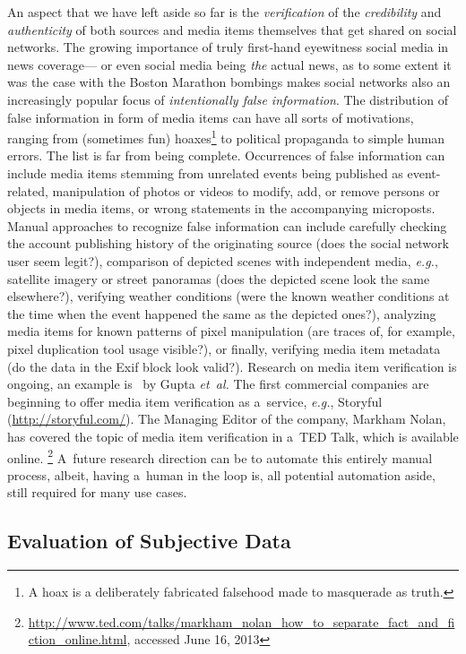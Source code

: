 An aspect that we have left aside so far is the \emph{verification}
of the \emph{credibility} and \emph{authenticity} of both sources
and media items themselves that get shared on social networks.
The growing importance of truly first-hand eyewitness social media in news coverage---%
or even social media being \emph{the} actual news,
as to some extent it was the case with the Boston Marathon bombings
makes social networks also an increasingly popular focus of \emph{intentionally false information}.
The distribution of false information in form of media items
can have all sorts of motivations, ranging from (sometimes fun)
hoaxes\footnote{A hoax is a deliberately fabricated falsehood made to masquerade as truth.}
to political propaganda to simple human errors.
The list is far from being complete.
Occurrences of false information can include
media items stemming from unrelated events being published as event-related,
manipulation  of photos or videos to modify, add, or remove persons or objects in media items,
or wrong statements in the accompanying microposts.
Manual approaches to recognize false information 
can include carefully checking the account publishing history
of the originating source (does the social network user seem legit?),
comparison of depicted scenes with independent media,
\emph{e.g.}, satellite imagery or street panoramas
(does the depicted scene look the same elsewhere?),
verifying weather conditions
(were the known weather conditions at the time
when the event happened the same as the depicted ones?),
analyzing media items for known patterns of pixel manipulation
(are traces of, for example, pixel duplication tool usage visible?),
or finally, verifying media item metadata
(do the data in the Exif block look valid?).
Research on media item verification is ongoing,
an example is~\cite{gupta2013fakingsandy} by Gupta \emph{et~al.}
The first commercial companies are beginning to offer media item 
verification as a~service, \emph{e.g.}, Storyful (\url{http://storyful.com/}).
The Managing Editor of the company, Markham Nolan,
has covered the topic of media item verification
in a~TED Talk, which is available online.%
\footnote{\url{http://www.ted.com/talks/markham_nolan_how_to_separate_fact_and_fiction_online.html},
accessed June 16, 2013}
A~future research direction can be to automate
this entirely manual process, albeit, having a~human in the loop
is, all potential automation aside, still required for many use cases.

\subsection{Evaluation of Subjective Data}

